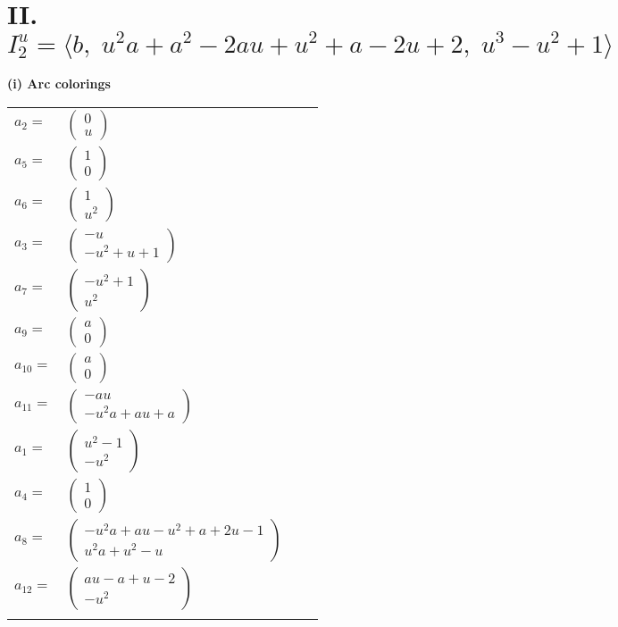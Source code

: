 \documentclass[1p]{elsarticle_modified}
\theoremstyle{definition}
\begin{document}
\centering \section*{II. $I^u_{2}= \langle b,\;u^2 a+a^2-2 a u+u^2+a-2 u+2,\;u^3- u^2+1 \rangle$}
\flushleft \textbf{(i) Arc colorings}\\
\begin{tabular}{m{7pt} m{180pt} m{7pt} m{180pt} }
\flushright $a_{2}=$&$\begin{pmatrix}0\\u\end{pmatrix}$ \\
\flushright $a_{5}=$&$\begin{pmatrix}1\\0\end{pmatrix}$ \\
\flushright $a_{6}=$&$\begin{pmatrix}1\\u^2\end{pmatrix}$ \\
\flushright $a_{3}=$&$\begin{pmatrix}- u\\- u^2+u+1\end{pmatrix}$ \\
\flushright $a_{7}=$&$\begin{pmatrix}- u^2+1\\u^2\end{pmatrix}$ \\
\flushright $a_{9}=$&$\begin{pmatrix}a\\0\end{pmatrix}$ \\
\flushright $a_{10}=$&$\begin{pmatrix}a\\0\end{pmatrix}$ \\
\flushright $a_{11}=$&$\begin{pmatrix}- a u\\- u^2 a+a u+a\end{pmatrix}$ \\
\flushright $a_{1}=$&$\begin{pmatrix}u^2-1\\- u^2\end{pmatrix}$ \\
\flushright $a_{4}=$&$\begin{pmatrix}1\\0\end{pmatrix}$ \\
\flushright $a_{8}=$&$\begin{pmatrix}- u^2 a+a u- u^2+a+2 u-1\\u^2 a+u^2- u\end{pmatrix}$ \\
\flushright $a_{12}=$&$\begin{pmatrix}a u- a+u-2\\- u^2\end{pmatrix}$\\&\end{tabular}
\end{document}
